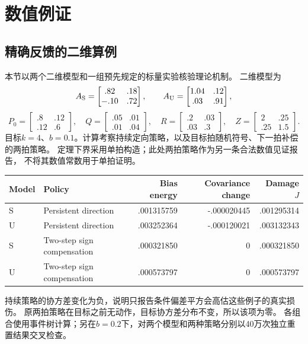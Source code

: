 \section{数值例证}
\subsection{精确反馈的二维算例}
本节以两个二维模型和一组预先规定的标量实验核验理论机制。
二维模型为
\[
A_{\rm S}=\begin{bmatrix}.82&.18\\-.10&.72\end{bmatrix},\qquad
A_{\rm U}=\begin{bmatrix}1.04&.12\\.03&.91\end{bmatrix},
\]
\[
P_0=\begin{bmatrix}.8&.12\\.12&.6\end{bmatrix},\quad
Q=\begin{bmatrix}.05&.01\\.01&.04\end{bmatrix},\quad
R=\begin{bmatrix}.2&.03\\.03&.3\end{bmatrix},\quad
Z=\begin{bmatrix}2&.25\\.25&1.5\end{bmatrix}.
\]
目标$k=4$、$b=0.1$。计算考察持续定向策略，以及目标拍随机符号、下一拍补偿的两拍策略。
定理下界采用单拍构造；此处两拍策略作为另一条合法数值见证报告，
不将其数值常数用于单拍证明。

\begin{table}[ht]
\centering\footnotesize
{}
\begin{tabular}{llrrr}
\toprule
Model & Policy & Bias energy & Covariance change & Damage $J$\\
\midrule
S & Persistent direction & .001315759 & -.000020445 & .001295314\\
U & Persistent direction & .003252364 & -.000120021 & .003132343\\
S & Two-step sign compensation & .000321850 & 0 & .000321850\\
U & Two-step sign compensation & .000573797 & 0 & .000573797\\
\bottomrule
\end{tabular}
\end{table}
持续策略的协方差变化为负，说明只报告条件偏差平方会高估这些例子的真实损伤。
原两拍策略在目标之前无动作，目标协方差分布不变，所以该项为零。
各组合使用事件树计算；另在$b=0.2$下，对两个模型和两种策略分别以40万次独立重置结果交叉检查。

